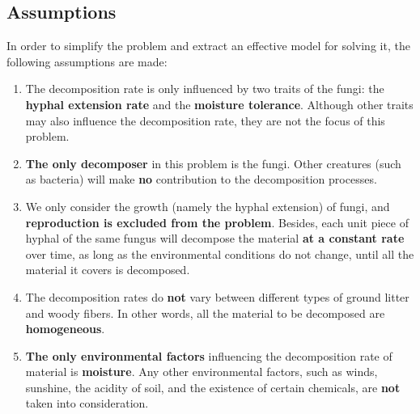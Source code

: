 \documentclass[a4paper,12pt]{article}
\begin{document}
\subsection{Assumptions}
In order to simplify the problem and extract an effective model for solving it, the following assumptions are made: 
\begin{enumerate} 
\setlength{\itemsep}{0ex} %
\item The decomposition rate is only influenced by two traits of the fungi: the \textbf{hyphal extension rate} and the \textbf{moisture tolerance}. Although other traits may also influence the decomposition rate, they are not the focus of this problem.
\item \textbf{The only decomposer} in this problem is the fungi. Other creatures (such as bacteria) will make \textbf{no} contribution to the decomposition processes.
\item We only consider the growth (namely the hyphal extension) of fungi, and \textbf{reproduction is excluded from the problem}. Besides, each unit piece of hyphal of the same fungus will decompose the material \textbf{at a constant rate} over time, as long as the environmental conditions do not change, until all the material it covers is decomposed.  
\item The decomposition rates do \textbf{not} vary between different types of ground litter and woody fibers. In other words, all the material to be decomposed are \textbf{homogeneous}.
\item \textbf{The only environmental factors} influencing the decomposition rate of material is \textbf{moisture}. Any other environmental factors, such as winds, sunshine, the acidity of soil, and the existence of certain chemicals, are \textbf{not} taken into consideration.
\end{enumerate}
\end{document}
